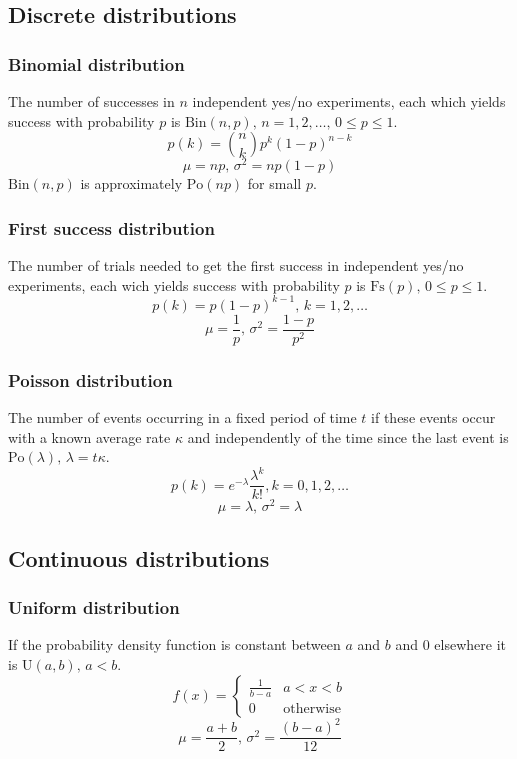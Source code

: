 \documentclass[
	a4paper,
	landscape,
	10pt,
]{article}
\begin{document}
\begin{multicols}{3}
\subsection{Discrete distributions}

\subsubsection*{Binomial distribution}
The number of successes in $n$ independent yes/no experiments, each which yields success with probability $p$ is $\textrm{Bin}(n,p),\,n=1,2,\dots,\, 0\leq p\leq1$.
\[p(k)=\binom{n}{k}p^k(1-p)^{n-k}\]
\[\mu = np,\,\sigma^2=np(1-p)\]
$\textrm{Bin}(n,p)$ is approximately $\textrm{Po}(np)$ for small $p$.

\subsubsection*{First success distribution}
The number of trials needed to get the first success in independent yes/no experiments, each wich yields success with probability $p$ is $\textrm{Fs}(p),\,0\leq p\leq1$.
\[p(k)=p(1-p)^{k-1},\,k=1,2,\dots\]
\[\mu = \frac1p,\,\sigma^2=\frac{1-p}{p^2}\]

\subsubsection*{Poisson distribution}
The number of events occurring in a fixed period of time $t$ if these events occur with a known average rate $\kappa$ and independently of the time since the last event is $\textrm{Po}(\lambda),\,\lambda=t\kappa$.
\[p(k)=e^{-\lambda}\frac{\lambda^k}{k!}, k=0,1,2,\dots\]
\[\mu=\lambda,\,\sigma^2=\lambda\]

\subsection{Continuous distributions}

\subsubsection*{Uniform distribution}
If the probability density function is constant between $a$ and $b$ and 0 elsewhere it is $\textrm{U}(a,b),\,a<b$.
\[f(x) = \left\{
\begin{array}{cl}
\frac{1}{b-a} & a<x<b\\
0 & \textrm{otherwise}
\end{array}\right.\]
\[\mu=\frac{a+b}{2},\,\sigma^2=\frac{(b-a)^2}{12}\]


\end{multicols}
\end{document}
